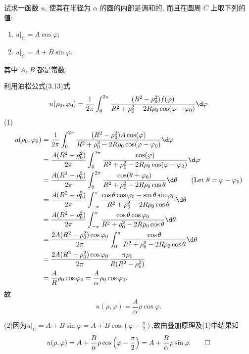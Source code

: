 \begin{exercise}[10]
  试求一函数 $u$, 使其在半径为 $\alpha$ 的圆的内部是调和的,
  而且在圆周 $C$ 上取下列的值:
  \begin{enumerate}[(1)]
    \item $u|_C = A\cos\varphi$;
    \item $u|_C = A + B\sin\varphi$.
  \end{enumerate}
  其中 $A$, $B$ 都是常数.
\end{exercise}


\begin{solution}
  利用泊松公式(3.13)式
  \[u(\rho_0,\varphi_0)=\frac{1}{2\pi}\int_0^{2\pi}\frac{(R^2-\rho_0^2)f(\varphi)}{R^2+\rho_0^2-2R\rho_0\cos(\varphi-\varphi_0)}\d\varphi\]
  (1)
  \begin{align*}
    u(\rho_0,\varphi_0)
    & = \frac{1}{2\pi}\int_0^{2\pi}\frac{(R^2-\rho_0^2)A\cos(\varphi)}{R^2+\rho_0^2-2R\rho_0\cos(\varphi-\varphi_0)}\d\varphi \\
    & = \frac{A(R^2-\rho_0^2)}{2\pi}\int_0^{2\pi}\frac{\cos(\varphi)}{R^2+\rho_0^2-2R\rho_0\cos(\varphi-\varphi_0)}\d\varphi \\
    & = \frac{A(R^2-\rho_0^2)}{2\pi}\int_{0}^{2\pi}\frac{\cos(\theta+\varphi_0)}{R^2+\rho_0^2-2R\rho_0\cos\theta}\d\theta \qquad (\text{Let}\ \theta=\varphi-\varphi_0) \\
    & = \frac{A(R^2-\rho_0^2)}{2\pi}\int_{-\pi}^{\pi}\frac{\cos\theta\cos\varphi_0-\sin\theta\sin\varphi_0}{R^2+\rho_0^2-2R\rho_0\cos\theta}\d\theta \\
    & = \frac{A(R^2-\rho_0^2)}{2\pi}\int_{-\pi}^{\pi}\frac{\cos\theta\cos\varphi_0}{R^2+\rho_0^2-2R\rho_0\cos\theta}\d\theta \\
    & = \frac{2A(R^2-\rho_0^2)\cos\varphi_0}{2\pi}\int_0^{\pi}\frac{\cos\theta}{R^2+\rho_0^2-2R\rho_0\cos\theta}\d\theta \\
    & = \frac{2A(R^2-\rho_0^2)\cos\varphi_0}{2\pi}\frac{\pi\rho_0}{R(R^2-\rho_0^2)} \\
    & = \frac{A}{R}\rho_0\cos\varphi_0=\frac{A}{\alpha}\rho_0\cos\varphi_0.
  \end{align*}
  故
  \[u(\rho,\varphi)=\frac{A}{\alpha}\rho\cos\varphi.\]

  (2)因为$\displaystyle u|_C=A+B\sin\varphi=A+B\cos(\varphi-\frac{\pi}{2})$,故由叠加原理及(1)中结果知
  \[u(\rho,\varphi)=A+\frac{B}{\alpha}\rho\cos\left(\varphi-\frac{\pi}{2}\right)=A+\frac{B}{\alpha}\rho\sin\varphi.\qedhere\]
\end{solution}


